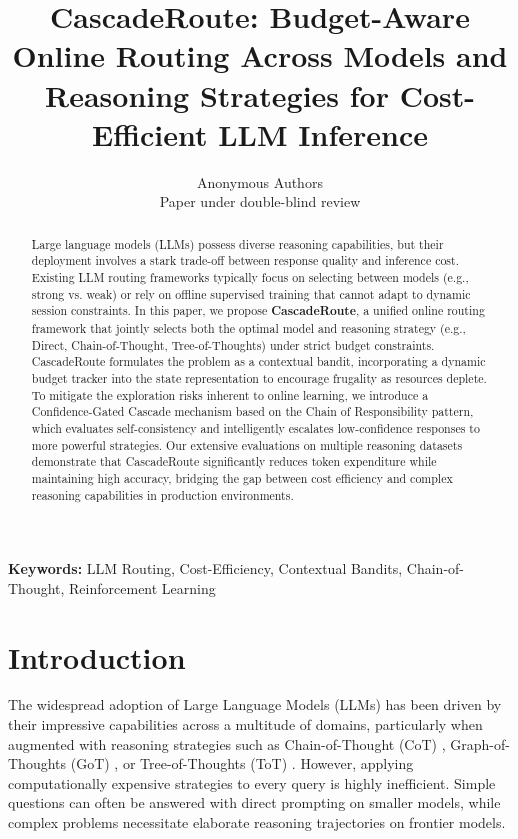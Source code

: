 \documentclass{article} %
\title{CascadeRoute: Budget-Aware Online Routing Across Models and Reasoning Strategies for Cost-Efficient LLM Inference}
\author{Anonymous Authors \\
Paper under double-blind review
}
\begin{document}
\maketitle

\begin{abstract}
Large language models (LLMs) possess diverse reasoning capabilities, but their deployment involves a stark trade-off between response quality and inference cost. Existing LLM routing frameworks typically focus on selecting between models (e.g., strong vs. weak) or rely on offline supervised training that cannot adapt to dynamic session constraints. In this paper, we propose \textbf{CascadeRoute}, a unified online routing framework that jointly selects both the optimal model and reasoning strategy (e.g., Direct, Chain-of-Thought, Tree-of-Thoughts) under strict budget constraints. CascadeRoute formulates the problem as a contextual bandit, incorporating a dynamic budget tracker into the state representation to encourage frugality as resources deplete. To mitigate the exploration risks inherent to online learning, we introduce a Confidence-Gated Cascade mechanism based on the Chain of Responsibility pattern, which evaluates self-consistency and intelligently escalates low-confidence responses to more powerful strategies. Our extensive evaluations on multiple reasoning datasets demonstrate that CascadeRoute significantly reduces token expenditure while maintaining high accuracy, bridging the gap between cost efficiency and complex reasoning capabilities in production environments.
\end{abstract}

\textbf{Keywords:} LLM Routing, Cost-Efficiency, Contextual Bandits, Chain-of-Thought, Reinforcement Learning

\section{Introduction}

The widespread adoption of Large Language Models (LLMs) has been driven by their impressive capabilities across a multitude of domains, particularly when augmented with reasoning strategies such as Chain-of-Thought (CoT) \citep{wei2022chain}, Graph-of-Thoughts (GoT) \citep{besta2024graph}, or Tree-of-Thoughts (ToT) \citep{yao2023tree}. However, applying computationally expensive strategies to every query is highly inefficient. Simple questions can often be answered with direct prompting on smaller models, while complex problems necessitate elaborate reasoning trajectories on frontier models. 
\end{document}
